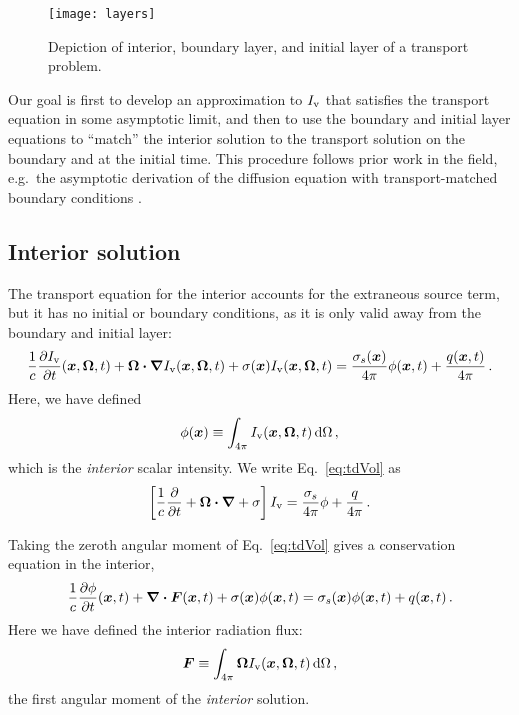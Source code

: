 \begin{figure}[htb]
  \centering
  \texttt{[image: layers]}
  \caption{Depiction of interior, boundary layer, and initial layer of a
  transport problem.}
  \label{fig:layers}
\end{figure}

Our goal is first to develop an approximation to $I_\mathrm{v}$ that satisfies the transport
equation in some asymptotic limit, and then to use the boundary and initial layer
equations to ``match'' the interior solution to the transport solution on the
boundary and at the initial time. This procedure follows prior work in the
field, e.g.~the asymptotic derivation of the diffusion equation with
transport-matched boundary conditions \cite{Mal1991}.

\subsection{Interior solution}\label{sec:adInterior}

The transport equation for the interior accounts for the extraneous source term,
but
it has no initial or boundary conditions, as it is only valid away from the
boundary and initial layer:
\begin{equation} \label{eq:tdVol}
  \frac{1}{c}\frac{\partial I_\mathrm{v}}{\partial t}(\bm{x},\bm{\Omega},t)
  + \bm{\Omega}\bm{\cdot} \bm{\nabla} I_\mathrm{v}(\bm{x},\bm{\Omega},t)
  + \sigma(\bm{x}) I_\mathrm{v}(\bm{x},\bm{\Omega},t)
  = \frac{\sigma_s(\bm{x})}{4\pi}
  \phi(\bm{x},t) + \frac{q(\bm{x},t)}{4\pi} \,.
\end{equation}
Here, we have defined
\begin{equation} \label{eq:tdPhi}
  \phi(\bm{x}) \equiv \int_{4\pi} I_\mathrm{v}(\bm{x}, \bm{\Omega},t) \mathop{}\!\mathrm{d} \Omega\,,
\end{equation}
which is the \emph{interior} scalar intensity. We write Eq.~\eqref{eq:tdVol} as
\begin{equation*}
  \left[ \frac{1}{c}\frac{\partial }{\partial t}
  + \bm{\Omega}\bm{\cdot} \bm{\nabla}
  + \sigma \right] I_\mathrm{v}
  = \frac{\sigma_s}{4\pi}
  \phi + \frac{q}{4\pi} \,.
\end{equation*}

Taking the zeroth angular moment of Eq.~\eqref{eq:tdVol} gives a conservation
equation in the interior,
\begin{equation} \label{eq:loVol}
\frac{1}{c} \frac{\partial \phi}{\partial t} (\bm{x}, t)
  + \bm{\nabla} \bm{\cdot}\bm{F}(\bm{x}, t)
  + \sigma(\bm{x}) \phi(\bm{x}, t)
 = \sigma_s(\bm{x}) \phi(\bm{x},t) + q(\bm{x},t)\,.
\end{equation}
Here we have defined the interior radiation flux:
\begin{equation}\label{eq:tdF}
  \bm{F} \equiv \int_{4\pi} \bm{\Omega} I_\mathrm{v}(\bm{x}, \bm{\Omega},t) \mathop{}\!\mathrm{d}
  \Omega\,,
\end{equation}
the first angular moment of the \emph{interior} solution.

